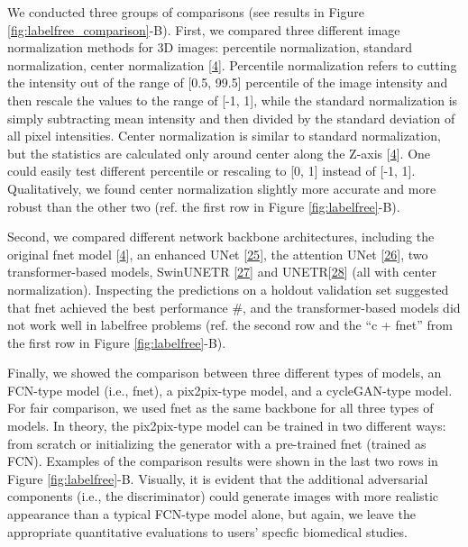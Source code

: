 We conducted three groups of comparisons (see results in Figure \ref{fig:labelfree_comparison}-B). First, we compared three different image normalization methods for 3D images: percentile normalization, standard normalization, center normalization {[}\protect\hyperlink{ref-Yq8wZ6hc}{4}{]}. Percentile normalization refers to cutting the intensity out of the range of {[}0.5, 99.5{]} percentile of the image intensity and then rescale the values to the range of {[}-1, 1{]}, while the standard normalization is simply subtracting mean intensity and then divided by the standard deviation of all pixel intensities. Center normalization is similar to standard normalization, but the statistics are calculated only around center along the Z-axis {[}\protect\hyperlink{ref-Yq8wZ6hc}{4}{]}. One could easily test different percentile or rescaling to {[}0, 1{]} instead of {[}-1, 1{]}. Qualitatively, we found center normalization slightly more accurate and more robust than the other two (ref. the first row in Figure \ref{fig:labelfree}-B).

Second, we compared different network backbone architectures, including the original fnet model {[}\protect\hyperlink{ref-Yq8wZ6hc}{4}{]}, an enhanced UNet {[}\protect\hyperlink{ref-M7480NLD}{25}{]}, the attention UNet {[}\protect\hyperlink{ref-OCow1hly}{26}{]}, two transformer-based models, SwinUNETR {[}\protect\hyperlink{ref-ZWL3IrVc}{27}{]} and UNETR{[}\protect\hyperlink{ref-XCKUntOB}{28}{]} (all with center normalization). Inspecting the predictions on a holdout validation set suggested that fnet achieved the best performance \#, and the transformer-based models did not work well in labelfree problems (ref. the second row and the ``c + fnet'' from the first row in Figure \ref{fig:labelfree}-B).

Finally, we showed the comparison between three different types of models, an FCN-type model (i.e., fnet), a pix2pix-type model, and a cycleGAN-type model. For fair comparison, we used fnet as the same backbone for all three types of models. In theory, the pix2pix-type model can be trained in two different ways: from scratch or initializing the generator with a pre-trained fnet (trained as FCN). Examples of the comparison results were shown in the last two rows in Figure \ref{fig:labelfree}-B. Visually, it is evident that the additional adversarial components (i.e., the discriminator) could generate images with more realistic appearance than a typical FCN-type model alone, but again, we leave the appropriate quantitative evaluations to users' specfic biomedical studies.

